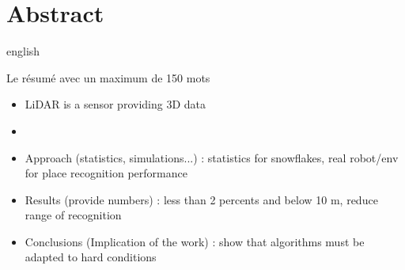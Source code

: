 \chapter*{Abstract}  

\begin{otherlanguage*}{english}



Le résumé avec un maximum de 150 mots
\begin{itemize}
    \item LiDAR is a sensor providing 3D data 
    \item 
    \item Approach (statistics, simulations...) : statistics for snowflakes, real robot/env for place recognition performance
    \item Results (provide numbers) : less than 2 percents and below 10 m, reduce range of recognition
    \item Conclusions (Implication of the work) : show that algorithms must be adapted to hard conditions 
\end{itemize}


\end{otherlanguage*}
